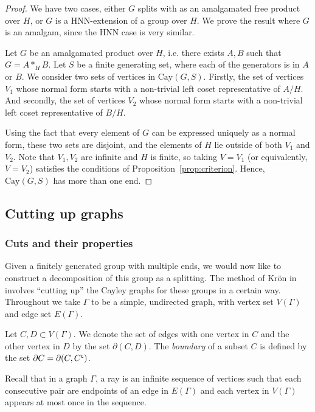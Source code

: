 \begin{proof}
    We have two cases, either \(G\) splits with as an amalgamated free product over \(H\), or \(G\) is a HNN-extension of a group over \(H\). We prove the result where \(G\) is an amalgam, since the HNN case is very similar.

    Let \(G\) be an amalgamated product over \(H\), i.e. there exists \(A,B\) such that \(G = A *_H B\).
    Let \(S\) be a finite generating set, where each of the generators is in \(A\) or \(B\). We consider two sets of vertices in \(\mathrm{Cay}(G,S)\). Firstly, the set of vertices \(V_1\) whose normal form starts with a non-trivial left coset representative of \(A/H\). And secondly, the set of vertices \(V_2\) whose normal form starts with a non-trivial left coset representative of \(B/H\).
    
    Using the fact that every element of \(G\) can be expressed uniquely as a normal form, these two sets are disjoint, and the elements of \(H\) lie outside of both \(V_1\) and \(V_2\). Note that \(V_1, V_2\) are infinite and \(H\) is finite, so taking \(V=V_1\) (or equivalently, \(V=V_2\)) satisfies the conditions of Proposition~\ref{prop:criterion}. Hence, \(\mathrm{Cay}(G,S)\) has more than one end.
\end{proof}

\subsection{Cutting up graphs}
\subsubsection{Cuts and their properties}
Given a finitely generated group with multiple ends, we would now like to construct a decomposition of this group as a splitting. The method of Kr{\"o}n in \cite{K10} involves ``cutting up'' the Cayley graphs for these groups in a certain way. Throughout we take \(\Gamma\) to be a simple, undirected graph, with vertex set \(V(\Gamma)\) and edge set \(E(\Gamma)\).

\begin{definition}
    Let \(C,D \subset V(\Gamma)\). We denote the set of edges with one vertex in \(C\) and the other vertex in \(D\) by the set \(\partial(C,D)\). The \emph{boundary} of a subset \(C\) is defined by the set \(\partial C = \partial(C, {C}^{\mathsf{c}})\).
\end{definition}

Recall that in a graph \(\Gamma\), a ray is an infinite sequence of vertices such that each consecutive pair are endpoints of an edge in \(E(\Gamma)\) and each vertex in \(V(\Gamma)\) appears at most once in the sequence.

